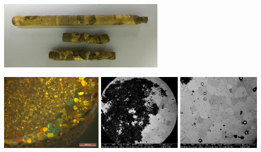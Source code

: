 \documentclass[usenames,dvipsnames]{beamer}
\begin{document}
\begin{frame}
\begin{center}
\includegraphics[width=0.60\textwidth]{img/tamgrano/Clavo1_Foto2.jpg} 
\end{center}



 \begin{multicols}{3}
\includegraphics[width=0.37\textwidth]{img/tamgrano/Clavo1.jpg}
\includegraphics[width=0.3\textwidth]{img/tamgrano/Clavo1Retro.jpg}
\includegraphics[width=0.3\textwidth]{img/tamgrano/Clavo1Retro2.jpg}
\end{multicols}
\end{frame}





\end{document}
